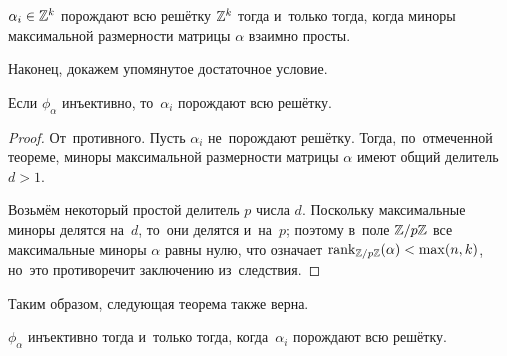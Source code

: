 \documentclass{article}
\begin{document}
\begin{theorem*}
    $\alpha_i \in \mathbb{Z}^k$ порождают всю решётку $\mathbb{Z}^k$ тогда и~только тогда,
    когда миноры максимальной размерности матрицы $\alpha$ взаимно просты.
\end{theorem*}

Наконец, докажем упомянутое достаточное условие.

\begin{lemma*}
    Если $\phi_\alpha$ инъективно, то~$\alpha_i$ порождают всю решётку.
\end{lemma*}

\begin{proof}
    От~противного. Пусть $\alpha_i$ не~порождают решётку. Тогда, по~отмеченной теореме,
    миноры максимальной размерности матрицы $\alpha$ имеют общий делитель $d > 1$.

    Возьмём некоторый простой делитель $p$ числа $d$. Поскольку максимальные миноры
    делятся на~$d$, то~они делятся и~на~$p$; поэтому в~поле $\mathbb{Z} / p \mathbb{Z}$
    все максимальные миноры $\alpha$ равны нулю, что означает $\mathrm{rank}_{\mathbb{Z} / p \mathbb{Z}}(\alpha) < \max(n, k)$,
    но~это противоречит заключению из~следствия.
\end{proof}

Таким образом, следующая теорема также верна.

\begin{theorem*}
    $\phi_\alpha$ инъективно тогда и~только тогда, когда~$\alpha_i$ порождают всю решётку.
\end{theorem*}
\end{document}
